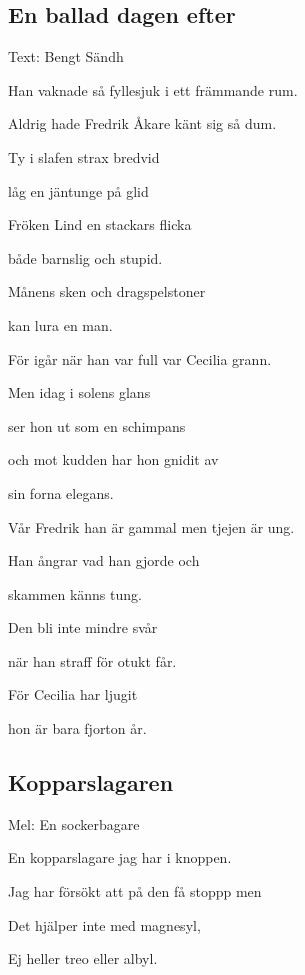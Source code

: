

\pagestyle{Dagen efter}



\subsection{\textbf{En ballad dagen efter}}

Text: Bengt Sändh\bigskip


Han vaknade så fyllesjuk i ett främmande rum.

Aldrig hade Fredrik Åkare känt sig så dum.

Ty i slafen strax bredvid

låg en jäntunge på glid

Fröken Lind en stackars flicka

både barnslig och stupid.\bigskip


Månens sken och dragspelstoner

kan lura en man.

För igår när han var full var Cecilia grann.

Men idag i solens glans

ser hon ut som en schimpans

och mot kudden har hon gnidit av

sin forna elegans.\bigskip


Vår Fredrik han är gammal men tjejen är ung.

Han ångrar vad han gjorde och

skammen känns tung.

Den bli inte mindre svår

när han straff för otukt får.

För Cecilia har ljugit

hon är bara fjorton år.

\subsection{\textbf{Kopparslagaren}}

Mel: En sockerbagare\bigskip

En kopparslagare jag har i knoppen.

Jag har försökt att på den få stoppp men

Det hjälper inte med magnesyl,

Ej heller treo eller albyl.

